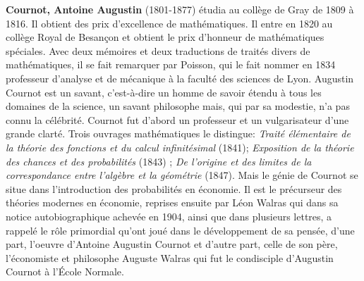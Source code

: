 \textbf{Cournot, Antoine Augustin} (1801-1877) étudia au collège de Gray de 1809 à 1816. Il obtient des prix d'excellence de mathématiques. Il entre en 1820 au collège Royal de Besançon et obtient le prix d'honneur de mathématiques spéciales. Avec deux mémoires et deux traductions de traités divers de mathématiques, il se fait remarquer par Poisson, qui le fait nommer en 1834 professeur d'analyse et de mécanique à la faculté des sciences de Lyon. Augustin Cournot est un savant, c'est-à-dire un homme de savoir étendu à tous les domaines de la science, un savant philosophe mais, qui par sa modestie, n'a pas connu la célébrité. Cournot fut d'abord un professeur et un vulgarisateur d'une grande clarté. Trois ouvrages mathématiques le distingue:\textit{ Traité élémentaire de la théorie des fonctions et du calcul infinitésimal} (1841); \textit{Exposition de la théorie des chances et des probabilités} (1843) ; \textit{De l'origine et des limites de la correspondance entre l'algèbre et la géométrie} (1847). Mais le génie de Cournot se situe dans l'introduction des probabilités en économie. Il est le précurseur des théories modernes en économie, reprises ensuite par Léon Walras qui dans sa notice autobiographique achevée en 1904, ainsi que dans plusieurs lettres, a rappelé le rôle primordial qu'ont joué dans le développement de sa pensée, d'une part, l'oeuvre d'Antoine Augustin Cournot et d'autre part, celle de son père, l'économiste et philosophe Auguste Walras qui fut le condisciple d'Augustin Cournot à l'École Normale.

